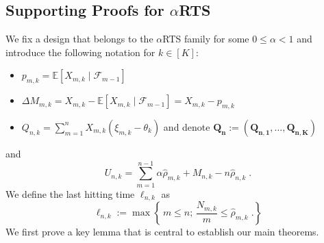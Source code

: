 \documentclass[11pt]{article}
\theoremstyle{plain}
\theoremstyle{definition}
\begin{document}
	\newpage
	\begin{appendix}
		\section{Supporting Proofs for $\alpha$RTS}\label{appnA}

We fix a design that belongs to the \(\alpha\)RTS family for some \(0\leq\alpha <1\) and introduce the following notation for \(k \in [K]\):
\begin{itemize}
	\item $p_{m,k} = \mathbb{E}[X_{m,k} \mid \mathcal{F}_{m-1}]$	
	\item $\Delta M_{m,k} = X_{m,k} - \mathbb{E}[X_{m,k} \mid \mathcal{F}_{m-1}] = X_{m,k} - p_{m,k}$
	\item $Q_{n,k} = \sum_{m=1}^{n}X_{m,k}(\xi_{m,k} - \theta_{k})$ and denote \(\mathbf{Q_n} := (\mathbf{Q_{n,1}}, \dots, \mathbf{Q_{n,K}})\)	
\end{itemize}
and
	\[U_{n,k} = \sum_{m=1}^{n-1} \alpha \hat{\rho}_{m,k} + M_{n,k} - n \hat{\rho}_{n,k}\;.\]
We define the last hitting time $\ell_{n,k}$ as
\begin{equation}\label{eq:stopping-time-def}
	\ell_{n,k} := \max \left\{\, m \leq n ; \, \frac{N_{m,k}}{m} \leq \hat{\rho}_{m,k}  \;.\right\}
\end{equation}
We first prove a key lemma that is central to establish our main theorems.


\end{appendix}
\end{document}
